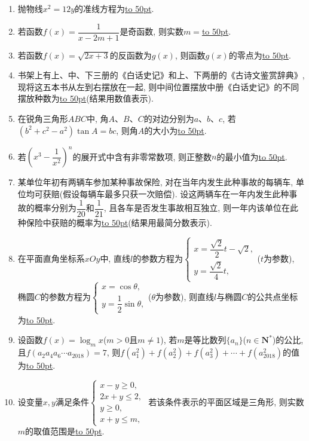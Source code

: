 \documentclass[10pt,a4paper]{article}
\newcommand{\blank}[1]{\underline{\hbox to #1pt{}}}
\begin{document}
\begin{enumerate}[1.]
\item 抛物线$x^2=12y$的准线方程为\blank{50}.
\item 若函数$f(x)=\dfrac1{x-2m+1}$是奇函数, 则实数$m=$\blank{50}.
\item 若函数$f(x)=\sqrt{2x+3}$的反函数为$g(x)$, 则函数$g(x)$的零点为\blank{50}.
\item 书架上有上、中、下三册的《白话史记》和上、下两册的《古诗文鉴赏辞典》, 现将这五本书从左到右摆放在一起, 则中间位置摆放中册《白话史记》的不同摆放种数为\blank{50}(结果用数值表示).
\item 在锐角三角形$ABC$中, 角$A$、$B$、$C$的对边分别为$a$、$b$、$c$, 若$(b^2+c^2-a^2)\tan A=bc$, 则角$A$的大小为\blank{50}.
\item 若$(x^3-\dfrac1{x^2})^n$的展开式中含有非零常数项, 则正整数$n$的最小值为\blank{50}.
\item 某单位年初有两辆车参加某种事故保险, 对在当年内发生此种事故的每辆车, 单位均可获赔(假设每辆车最多只获一次赔偿). 设这两辆车在一年内发生此种事故的概率分别为$\dfrac1{20}$和$\dfrac1{21}$, 且各车是否发生事故相互独立, 则一年内该单位在此种保险中获赔的概率为\blank{50}(结果用最简分数表示).
\item 在平面直角坐标系$xOy$中, 直线$l$的参数方程为$\begin{cases} x=\dfrac{\sqrt2}2t-\sqrt2, \\ y=\dfrac{\sqrt2}4t, \end{cases}$($t$为参数), 椭圆$C$的参数方程为$\begin{cases} x=\cos \theta,  \\ y=\dfrac12\sin \theta,  \end{cases}$($\theta$为参数), 则直线$l$与椭圆$C$的公共点坐标为\blank{50}.
\item 设函数$f(x)=\log_m x$($m>0$且$m\ne 1$), 若$m$是等比数列$\{a_n\}$($n\in \mathbf{N}^*$)的公比, 且$f(a_2a_4a_6\cdots a_{2018})=7$, 则$f(a_1^2)+f(a_2^2)+f(a_3^2)+\cdots+f(a_{2018}^2)$的值为\blank{50}.
\item 设变量$x,y$满足条件$\begin{cases}  x-y\ge 0, \\ 2x+y\le 2, \\ y\ge 0, \\ x+y\le m, \end{cases}$ 若该条件表示的平面区域是三角形, 则实数$m$的取值范围是\blank{50}.



\end{enumerate}
\end{document}
